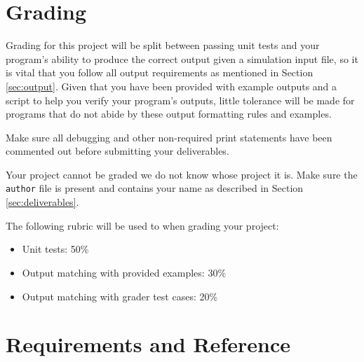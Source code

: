 \documentclass[10pt]{article}
\begin{document}

\section{Grading}

Grading for this project will be split between passing unit tests and your program's ability to produce the correct output given a simulation input file, so it is vital that you follow all output requirements as mentioned in Section \ref{sec:output}. Given that you have been provided with example outputs and a script to help you verify your program's outputs, little tolerance will be made for programs that do not abide by these output formatting rules and examples.

Make sure all debugging and other non-required print statements have been commented out before submitting your deliverables.

Your project cannot be graded we do not know whose project it is. Make sure the \texttt{author} file is present and contains your name as described in Section \ref{sec:deliverables}.

The following rubric will be used to when grading your project:

\begin{itemize}
    \item Unit tests: 50\%
    \item Output matching with provided examples: 30\%
    \item Output matching with grader test cases: 20\%
\end{itemize}


\section{Requirements and Reference}
\label{sec:req_refs}
\end{document}
